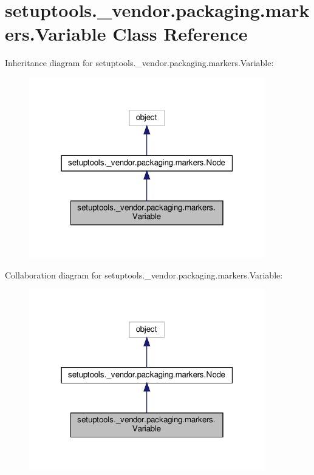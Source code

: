 \hypertarget{classsetuptools_1_1__vendor_1_1packaging_1_1markers_1_1Variable}{}\section{setuptools.\+\_\+vendor.\+packaging.\+markers.\+Variable Class Reference}
\label{classsetuptools_1_1__vendor_1_1packaging_1_1markers_1_1Variable}


Inheritance diagram for setuptools.\+\_\+vendor.\+packaging.\+markers.\+Variable\+:
\nopagebreak
\begin{figure}[H]
\begin{center}
\leavevmode
\includegraphics[width=291pt]{classsetuptools_1_1__vendor_1_1packaging_1_1markers_1_1Variable__inherit__graph}
\end{center}
\end{figure}


Collaboration diagram for setuptools.\+\_\+vendor.\+packaging.\+markers.\+Variable\+:
\nopagebreak
\begin{figure}[H]
\begin{center}
\leavevmode
\includegraphics[width=291pt]{classsetuptools_1_1__vendor_1_1packaging_1_1markers_1_1Variable__coll__graph}
\end{center}
\end{figure}
